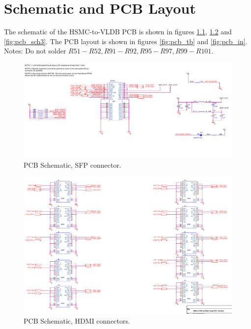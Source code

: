 \documentclass[main.tex]{subfiles}
\begin{document}
\chapter{Schematic and PCB Layout} 

The schematic of the HSMC-to-VLDB PCB is shown in figures \ref{fig:pcb_sch1}, \ref{fig:pcb_sch2} and \ref{fig:pcb_sch3}. The PCB layout is shown in figures \ref{fig:pcb_tb} and \ref{fig:pcb_in}. Notes: Do not solder $R51 - R52, R91 - R92, R95 - R97, R99 - R101$.

\begin{figure} %
\begin{center}
\includegraphics[width=1\linewidth]{../img/pcb_sch1}
\caption{PCB Schematic, SFP connector.}
\label{fig:pcb_sch1}
\end{center}
\end{figure}

\begin{figure} %
\begin{center}
\includegraphics[width=1\linewidth]{../img/pcb_sch2}
\caption{PCB Schematic, HDMI connectors.}
\label{fig:pcb_sch2}
\end{center}
\end{figure}
\end{document}
